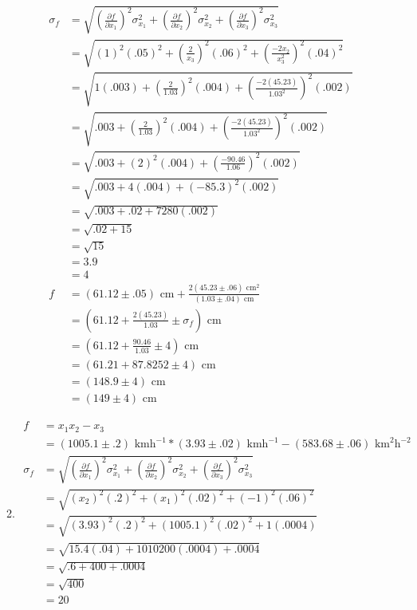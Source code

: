 \documentclass{article}
\begin{document}
\begin{enumerate}
\begin{enumerate}
\begin{align*}
\sigma_{f} &= \sqrt{(\frac{\partial f}{\partial x_1})^2\sigma_{x_1}^2 + (\frac{\partial f}{\partial x_2})^2\sigma_{x_2}^2 + (\frac{\partial f}{\partial x_3})^2\sigma_{x_3}^2}\\
&= \sqrt{(1)^2(.05)^2 + (\frac2{x_3})^2(.06)^2 + (\frac{-2x_2}{x_3^2})^2(.04)^2}\\
&= \sqrt{1(.003) + (\frac2{1.03})^2(.004) + (\frac{-2(45.23)}{1.03^2})^2(.002)}\\
&= \sqrt{.003 + (\frac2{1.03})^2(.004) + (\frac{-2(45.23)}{1.03^2})^2(.002)}\\
&= \sqrt{.003 + (2)^2(.004) + (\frac{-90.46}{1.06})^2(.002)}\\
&= \sqrt{.003 + 4(.004) + (-85.3)^2(.002)}\\
&= \sqrt{.003 + .02 + 7280(.002)}\\
&= \sqrt{.02 + 15}\\
&= \sqrt{15}\\
&= 3.9\\
&= 4\\
f &= (61.12 \pm .05)\text{ cm} + \frac{2(45.23 \pm .06)\text{ cm}^2}{(1.03 \pm .04)\text{ cm}}\\
&= (61.12 + \frac{2(45.23)}{1.03} \pm \sigma_{f})\text{ cm}\\
&= (61.12 + \frac{90.46}{1.03} \pm 4)\text{ cm}\\
&= (61.21 + 87.8252 \pm 4)\text{ cm}\\
&= (148.9 \pm 4)\text{ cm}\\
&= (149 \pm 4)\text{ cm}
\end{align*}
\item
\begin{align*}
f &= x_1x_2 - x_3\\
&= (1005.1 \pm .2)\text{ kmh}^{-1} * (3.93 \pm .02)\text{ kmh}^{-1} - (583.68 \pm .06)\text{ km}^2\text{h}^{-2}\\
\sigma_{f} &= \sqrt{(\frac{\partial f}{\partial x_1})^2\sigma_{x_1}^2 + (\frac{\partial f}{\partial x_2})^2\sigma_{x_2}^2 + (\frac{\partial f}{\partial x_3})^2\sigma_{x_3}^2}\\
&= \sqrt{(x_2)^2(.2)^2 + (x_1)^2(.02)^2 + (-1)^2(.06)^2}\\
&= \sqrt{(3.93)^2(.2)^2 + (1005.1)^2(.02)^2 + 1(.0004)}\\
&= \sqrt{15.4(.04) + 1010200(.0004) + .0004}\\
&= \sqrt{.6 + 400 + .0004}\\
&= \sqrt{400}\\
&= 20\\

\end{align*}
\end{enumerate}
\end{enumerate}
\end{document}
